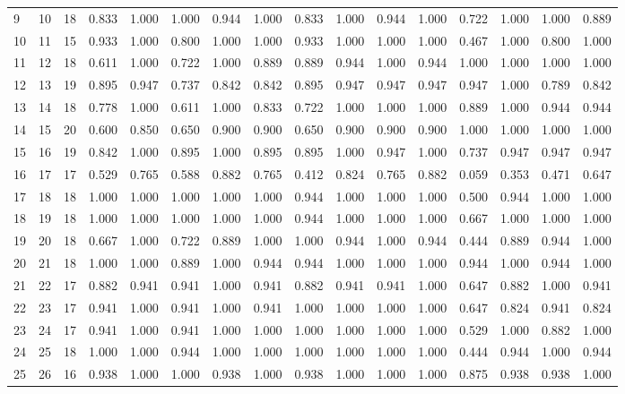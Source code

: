 \begin{longtable}{lrllllllllllllll}
9 & 10 & 18 & 0.833 & 1.000 & 1.000 & 0.944 & 1.000 & 0.833 & 1.000 & 0.944 & 1.000 & 0.722 & 1.000 & 1.000 & 0.889 \\
10 & 11 & 15 & 0.933 & 1.000 & 0.800 & 1.000 & 1.000 & 0.933 & 1.000 & 1.000 & 1.000 & 0.467 & 1.000 & 0.800 & 1.000 \\
11 & 12 & 18 & 0.611 & 1.000 & 0.722 & 1.000 & 0.889 & 0.889 & 0.944 & 1.000 & 0.944 & 1.000 & 1.000 & 1.000 & 1.000 \\
12 & 13 & 19 & 0.895 & 0.947 & 0.737 & 0.842 & 0.842 & 0.895 & 0.947 & 0.947 & 0.947 & 0.947 & 1.000 & 0.789 & 0.842 \\
13 & 14 & 18 & 0.778 & 1.000 & 0.611 & 1.000 & 0.833 & 0.722 & 1.000 & 1.000 & 1.000 & 0.889 & 1.000 & 0.944 & 0.944 \\
14 & 15 & 20 & 0.600 & 0.850 & 0.650 & 0.900 & 0.900 & 0.650 & 0.900 & 0.900 & 0.900 & 1.000 & 1.000 & 1.000 & 1.000 \\
15 & 16 & 19 & 0.842 & 1.000 & 0.895 & 1.000 & 0.895 & 0.895 & 1.000 & 0.947 & 1.000 & 0.737 & 0.947 & 0.947 & 0.947 \\
16 & 17 & 17 & 0.529 & 0.765 & 0.588 & 0.882 & 0.765 & 0.412 & 0.824 & 0.765 & 0.882 & 0.059 & 0.353 & 0.471 & 0.647 \\
17 & 18 & 18 & 1.000 & 1.000 & 1.000 & 1.000 & 1.000 & 0.944 & 1.000 & 1.000 & 1.000 & 0.500 & 0.944 & 1.000 & 1.000 \\
18 & 19 & 18 & 1.000 & 1.000 & 1.000 & 1.000 & 1.000 & 0.944 & 1.000 & 1.000 & 1.000 & 0.667 & 1.000 & 1.000 & 1.000 \\
19 & 20 & 18 & 0.667 & 1.000 & 0.722 & 0.889 & 1.000 & 1.000 & 0.944 & 1.000 & 0.944 & 0.444 & 0.889 & 0.944 & 1.000 \\
20 & 21 & 18 & 1.000 & 1.000 & 0.889 & 1.000 & 0.944 & 0.944 & 1.000 & 1.000 & 1.000 & 0.944 & 1.000 & 0.944 & 1.000 \\
21 & 22 & 17 & 0.882 & 0.941 & 0.941 & 1.000 & 0.941 & 0.882 & 0.941 & 0.941 & 1.000 & 0.647 & 0.882 & 1.000 & 0.941 \\
22 & 23 & 17 & 0.941 & 1.000 & 0.941 & 1.000 & 0.941 & 1.000 & 1.000 & 1.000 & 1.000 & 0.647 & 0.824 & 0.941 & 0.824 \\
23 & 24 & 17 & 0.941 & 1.000 & 0.941 & 1.000 & 1.000 & 1.000 & 1.000 & 1.000 & 1.000 & 0.529 & 1.000 & 0.882 & 1.000 \\
24 & 25 & 18 & 1.000 & 1.000 & 0.944 & 1.000 & 1.000 & 1.000 & 1.000 & 1.000 & 1.000 & 0.444 & 0.944 & 1.000 & 0.944 \\
25 & 26 & 16 & 0.938 & 1.000 & 1.000 & 0.938 & 1.000 & 0.938 & 1.000 & 1.000 & 1.000 & 0.875 & 0.938 & 0.938 & 1.000 \\

\end{longtable}
